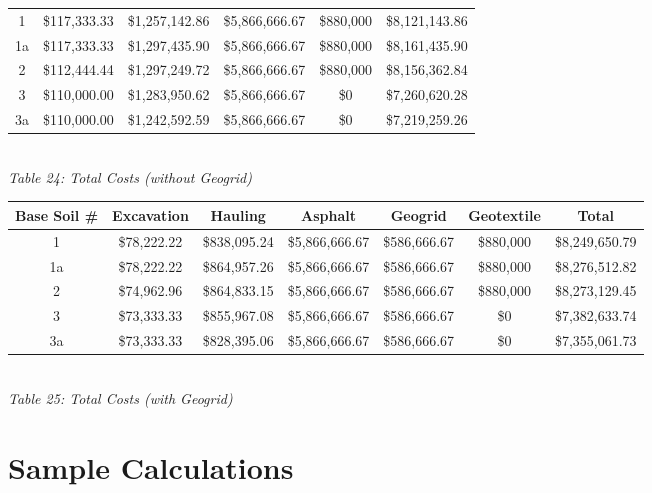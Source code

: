 \documentclass{article}
\begin{document}
\begin{center}
\begin{tabular}{|c|ccccc|}
        1  & \$117,333.33 & \$1,257,142.86 & \$5,866,666.67 & \$880,000&\$8,121,143.86  \\
        1a & \$117,333.33 & \$1,297,435.90 & \$5,866,666.67 & \$880,000&\$8,161,435.90  \\
        2  & \$112,444.44 & \$1,297,249.72 & \$5,866,666.67 & \$880,000&\$8,156,362.84  \\
        3  & \$110,000.00 & \$1,283,950.62 & \$5,866,666.67 & \$0&\$7,260,620.28  \\
        3a & \$110,000.00 & \$1,242,592.59 & \$5,866,666.67 & \$0&\$7,219,259.26 \\\hline
    \end{tabular}
    \vspace{3mm}
    \emph{\\Table 24: Total Costs (without Geogrid)\\}
    \vspace{7mm}
    \begin{tabular}{|c|cccccc|}
        \hline
        \textbf{Base Soil \#} & \textbf{Excavation} & \textbf{Hauling} & \textbf{Asphalt} & \textbf{Geogrid} & \textbf{Geotextile} & \textbf{Total} \\\hline
        1  & \$78,222.22 & \$838,095.24 & \$5,866,666.67 & \$586,666.67 & \$880,000&\$8,249,650.79  \\
        1a & \$78,222.22 & \$864,957.26 & \$5,866,666.67 & \$586,666.67 & \$880,000&\$8,276,512.82  \\
        2  & \$74,962.96 & \$864,833.15 & \$5,866,666.67 & \$586,666.67 & \$880,000&\$8,273,129.45  \\
        3  & \$73,333.33 & \$855,967.08 & \$5,866,666.67 & \$586,666.67 & \$0&\$7,382,633.74  \\
        3a & \$73,333.33 & \$828,395.06 & \$5,866,666.67 & \$586,666.67 & \$0&\$7,355,061.73\\\hline
    \end{tabular}
    \vspace{3mm}
    \emph{\\Table 25: Total Costs (with Geogrid)\\}
    
    
\end{center}
\newpage
\section{Sample Calculations}
\end{document}
